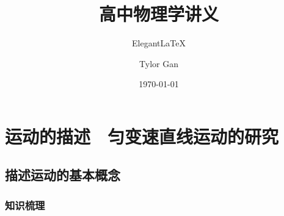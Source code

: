 \documentclass[cn,11pt]{elegantbook}
\title{高中物理学讲义}
\subtitle{Elegant\LaTeX{} }
\author{Tylor Gan}
\institute{Tencent}
\date{\today}
\begin{document}
\maketitle
\tableofcontents


\mainmatter
\hypersetup{pageanchor=true}

\chapter{运动的描述　匀变速直线运动的研究}

   \section{描述运动的基本概念}
      \subsection{知识梳理}
\end{document}
